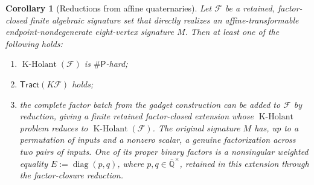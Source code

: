 \documentclass[11pt,letterpaper,onecolumn]{article}
\theoremstyle{plain}
\newtheorem{corollary}[corollary]{Corollary}
\theoremstyle{definition}
\theoremstyle{remark}
\newcommand{\AlgNums}{\overline{\mathbb Q}}
\newcommand{\cF}{\mathcal F}
\newcommand{\KHolant}{\operatorname{K\text{-}Holant}}
\newcommand{\Tract}{\mathsf{Tract}}
\newcommand{\SharpP}{\#\mathsf P}
\newcommand{\diag}{\operatorname{diag}}
\begin{document}
\begin{corollary}[Reductions from affine quaternaries]
\label{cor:p1-affine-eight-vertex-operational}
Let \(\cF\) be a retained, factor-closed finite algebraic signature
set that directly realizes an affine-transformable endpoint-nondegenerate eight-vertex signature
\(M\).
Then at least one of the following holds:
\begin{enumerate}[label=\textnormal{(\roman*)}]
\item \(\KHolant(\cF)\) is \(\SharpP\)-hard;
\item \(\Tract(K\cF)\) holds;
\item the complete factor batch from the gadget construction can be
      added to \(\cF\) by reduction, giving a finite retained factor-closed
      extension whose \(\KHolant\) problem reduces to \(\KHolant(\cF)\). The original
      signature \(M\) has, up to a permutation of inputs and a nonzero
      scalar, a genuine factorization across two pairs of inputs.
      One of its proper binary factors is a nonsingular weighted equality
      \(E:=\diag(p,q)\), where \(p,q\in\AlgNums^\times\), retained in
      this extension through the factor-closure reduction.
\end{enumerate}
\end{corollary}
\end{document}
